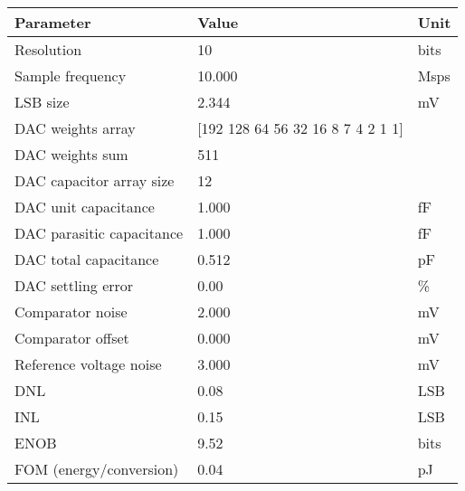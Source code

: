 \begin{tabular}{lll}
\toprule
Parameter & Value & Unit \\
\midrule
Resolution & 10 & bits \\
Sample frequency & 10.000 & Msps \\
LSB size & 2.344 & mV \\
DAC weights array & [192 128  64  56  32  16   8   7   4   2   1   1] &  \\
DAC weights sum & 511 &  \\
DAC capacitor array size & 12 &  \\
DAC unit capacitance & 1.000 & fF \\
DAC parasitic capacitance & 1.000 & fF \\
DAC total capacitance & 0.512 & pF \\
DAC settling error & 0.00 & \% \\
Comparator noise & 2.000 & mV \\
Comparator offset & 0.000 & mV \\
Reference voltage noise & 3.000 & mV \\
DNL & 0.08 & LSB \\
INL & 0.15 & LSB \\
ENOB & 9.52 & bits \\
FOM (energy/conversion) & 0.04 & pJ \\
\bottomrule
\end{tabular}

